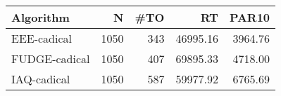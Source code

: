 \begin{tabular}{lrrrr}
\toprule
    Algorithm &    N &  \#TO &       RT &   PAR10 \\
\midrule
  EEE-cadical & 1050 &  343 & 46995.16 & 3964.76 \\
FUDGE-cadical & 1050 &  407 & 69895.33 & 4718.00 \\
  IAQ-cadical & 1050 &  587 & 59977.92 & 6765.69 \\
\bottomrule
\end{tabular}
